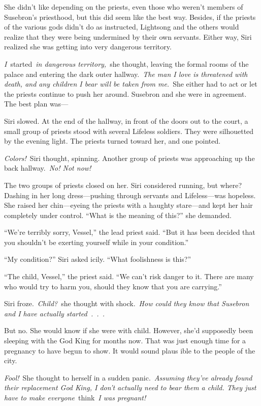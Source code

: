 She didn’t like depending on the priests, even those who weren’t members of Susebron’s priesthood, but this did seem like the best way. Besides, if the priests of the various gods didn’t do as instructed, Lightsong and the others would realize that they were being undermined by their own servants. Either way, Siri realized she was getting into very dangerous territory.

\textit{I}~started~\textit{in dangerous territory,}~she thought, leaving the formal rooms of the palace and entering the dark outer hallway.~\textit{The man I love is threatened with death, and any children I bear will be taken from me.}~She either had to act or let the priests continue to push her around. Susebron and she were in agreement. The best plan was—

Siri slowed. At the end of the hallway, in front of the doors out to the court, a small group of priests stood with several Lifeless soldiers. They were silhouetted by the evening light. The priests turned toward her, and one pointed.

\textit{Colors!}~Siri thought, spinning. Another group of priests was approaching up the back hallway.~\textit{No! Not now!}

The two groups of priests closed on her. Siri considered running, but where? Dashing in her long dress—pushing through servants and Lifeless—was hopeless. She raised her chin—eyeing the priests with a haughty stare—and kept her hair completely under control. “What is the meaning of this?” she demanded.

“We’re terribly sorry, Vessel,” the lead priest said. “But it has been decided that you shouldn’t be exerting yourself while in your condition.”

“My condition?” Siri asked icily. “What foolishness is this?”

“The child, Vessel,” the priest said. “We can’t risk danger to it. There are many who would try to harm you, should they know that you are carrying.”

Siri froze.~\textit{Child?}~she thought with shock.~\textit{How could they know that Susebron and I have actually started~.~.~.}

But no. She would know if she were with child. However, she’d supposedly been sleeping with the God King for months now. That was just enough time for a pregnancy to have begun to show. It would sound plaus ible to the people of the city.

\textit{Fool!}~She thought to herself in a sudden panic.~\textit{Assuming they’ve already found their replacement God King, I don’t actually need to bear them a child. They just have to make everyone}~think~\textit{I was pregnant!}

